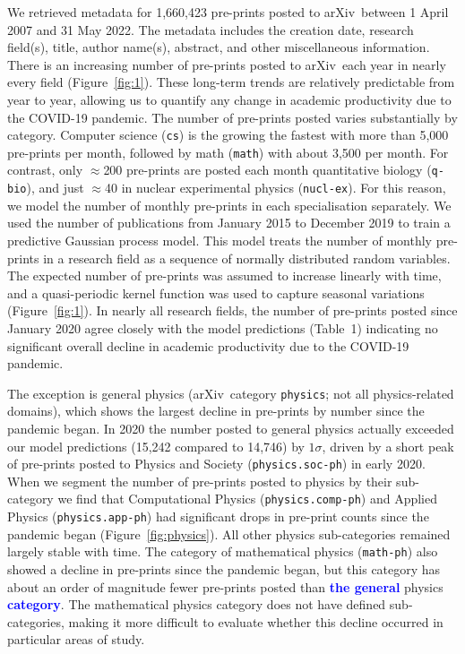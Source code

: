 \documentclass[]{rsos}%
\newcommand{\arxiv}{arXiv}
\newcommand{\change}[1]{\textcolor{blue}{\textbf{#1}}}
\begin{document}
We retrieved metadata for 1,660,423 pre-prints posted to \arxiv\ between 1 April 2007 and 31 May 2022. The metadata includes the creation date, research field(s), title, author name(s), abstract, and other miscellaneous information\cite{Clement:2019}. There is an increasing number of pre-prints posted to \arxiv\ each year in nearly every field (Figure~\ref{fig:1}). These long-term trends are relatively predictable from year to year, allowing us to quantify any change in academic productivity due to the COVID-19 pandemic. The number of pre-prints posted varies substantially by category. Computer science (\texttt{cs}) is the growing the fastest with more than 5,000 pre-prints per month, followed by math (\texttt{math}) with about 3,500 per month. For contrast, only $\approx$200 pre-prints are posted each month quantitative biology (\texttt{q-bio}), and just $\approx$40 in nuclear experimental physics (\texttt{nucl-ex}). For this reason, we model the number of monthly pre-prints in each specialisation separately. We used the number of publications from January 2015 to December 2019 to train a predictive Gaussian process model\cite{Rasmussen:2006}. This model treats the number of monthly pre-prints in a research field as a sequence of normally distributed random variables. The expected number of pre-prints was assumed to increase linearly with time, and a quasi-periodic kernel function\cite{Rasmussen:2006,Ambikasaran:2014} was used to capture seasonal variations (Figure~\ref{fig:1}). In nearly all research fields, the number of pre-prints posted since January 2020 agree closely with the model predictions (Table~1) indicating no significant overall decline in academic productivity due to the COVID-19 pandemic. %

The exception is general physics (\arxiv\ category \texttt{physics}; not all physics-related domains), which shows the largest decline in pre-prints by number since the pandemic began. In 2020 the number posted to general physics actually exceeded our model predictions (15,242 compared to 14,746) by $1\sigma$, driven by a short peak of pre-prints posted to Physics and Society (\texttt{physics.soc-ph}) in early 2020. When we segment the number of pre-prints posted to physics by their sub-category we find that Computational Physics (\texttt{physics.comp-ph}) and Applied Physics (\texttt{physics.app-ph}) had significant drops in pre-print counts since the pandemic began (Figure~\ref{fig:physics}). All other physics sub-categories remained largely stable with time. The category of mathematical physics (\texttt{math-ph}) also showed a decline in pre-prints since the pandemic began, but this category has about an order of magnitude fewer pre-prints posted than \change{the general} physics \change{category}. The mathematical physics category does not have defined sub-categories, making it more difficult to evaluate whether this decline occurred in particular areas of study.
\end{document}
